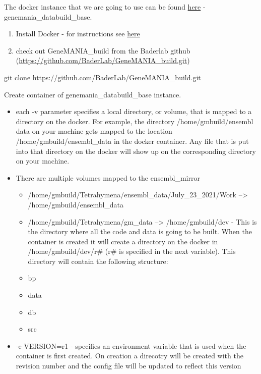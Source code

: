 \documentclass[]{book}
\newenvironment{Shaded}{\begin{snugshade}}{\end{snugshade}}
\newcommand{\FunctionTok}[1]{\textcolor[rgb]{0.00,0.00,0.00}{#1}}
\newcommand{\NormalTok}[1]{#1}
\providecommand{\tightlist}{%
  \setlength{\itemsep}{0pt}\setlength{\parskip}{0pt}}
\begin{document}
The docker instance that we are going to use can be found
\href{https://hub.docker.com/repository/docker/baderlab/genemania_databuild_base}{here}
- genemania\_databuild\_base.

\begin{enumerate}
\def\labelenumi{\arabic{enumi}.}
\tightlist
\item
  Install Docker - for instructions see
  \href{https://docs.docker.com/get-docker/}{here}
\item
  check out GeneMANIA\_build from the Baderlab github
  (\url{https://github.com/BaderLab/GeneMANIA_build.git})
\end{enumerate}

\begin{Shaded}
\begin{Highlighting}[]
\FunctionTok{git}\NormalTok{ clone https://github.com/BaderLab/GeneMANIA_build.git}
\end{Highlighting}
\end{Shaded}

Create container of genemania\_databuild\_base instance.

\begin{itemize}
\tightlist
\item
  each -v parameter specifies a local directory, or volume, that is
  mapped to a directory on the docker. For example, the directory
  /home/gmbuild/ensembl data on your machine gets mapped to the location
  /home/gmbuild/ensembl\_data in the docker container. Any file that is
  put into that directory on the docker will show up on the
  corresponding directory on your machine.
\item
  There are multiple volumes mapped to the ensembl\_mirror

  \begin{itemize}
  \tightlist
  \item
    /home/gmbuild/Tetrahymena/ensembl\_data/July\_23\_2021/Work
    --\textgreater{} /home/gmbuild/ensembl\_data
  \item
    /home/gmbuild/Tetrahymena/gm\_data --\textgreater{}
    /home/gmbuild/dev - This is the directory where all the code and
    data is going to be built. When the container is created it will
    create a directory on the docker in /home/gmbuild/dev/r\# (r\# is
    specified in the next variable). This directory will contain the
    following structure:
  \item
    bp
  \item
    data
  \item
    db
  \item
    src
  \end{itemize}
\item
  -e VERSION=r1 - specifies an environment variable that is used when
  the container is first created. On creation a direcotry will be
  created with the revision number and the config file will be updated
  to reflect this version
\end{itemize}
\end{document}
